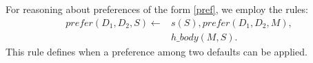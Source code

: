 \documentclass{article}
\newcommand{\memo}[1]{
  \ifthenelse {\boolean{includeMemo}}{\medskip\noindent\fbox{\begin{minipage}[b]{\dimexpr\linewidth-1em}#1\end{minipage}}\medskip\newline} 
}
\begin{document}
 
 For reasoning about preferences of the form \eqref{pref}, we employ the rules:
% 
{
\begin{equation}\label{lp:pref}
\begin{array}{ll}
prefer(D_1, D_2, S) \leftarrow &  s(S),   prefer(D_1, D_2, M),   \\
     & h\_body(M, S). 
      \end{array}
\end{equation} 
}
%
This rule defines when a preference among two defaults can be applied. 
%
%
%
% 
%
%
%
%
%
\end{document}
